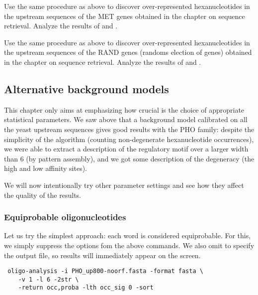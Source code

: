 \begin{exercise}
  Use the same procedure as above to discover over-represented
  hexanucleotides in the upstream sequences of the MET genes obtained
  in the chapter on sequence retrieval. Analyze the results of
   and .
\end{exercise}


\begin{exercise}
  Use the same procedure as above to discover over-represented
  hexanucleotides in the upstream sequences of the RAND genes (randoms
  election of genes) obtained in the chapter on sequence
  retrieval. Analyze the results of  and
  .
\end{exercise}


\subsection{Alternative background models}

This chapter only aims at emphasizing how crucial is the choice of
appropriate statistical parameters. We saw above that a background
model calibrated on all the yeast upstream sequences gives good
results with the PHO family: despite the simplicity of the algorithm
(counting non-degenerate hexanucleotide occurrences), we were able to
extract a description of the regulatory motif over a larger width than
6 (by pattern assembly), and we got some description of the degeneracy
(the high and low affinity sites).

We will now intentionally try other parameter settings and see how
they affect the quality of the results.

\subsubsection{Equiprobable oligonucleotides}

Let us try the simplest approach: each word is considered
equiprobable. For this, we simply suppress the options  fom the above commands. We
also omit to specify the output file, so results will immediately
appear on the screen.

{\color{Blue} \begin{footnotesize} 
\begin{verbatim}
 oligo-analysis -i PHO_up800-noorf.fasta -format fasta \ 
    -v 1 -l 6 -2str \
    -return occ,proba -lth occ_sig 0 -sort 
\end{verbatim} \end{footnotesize}
}


